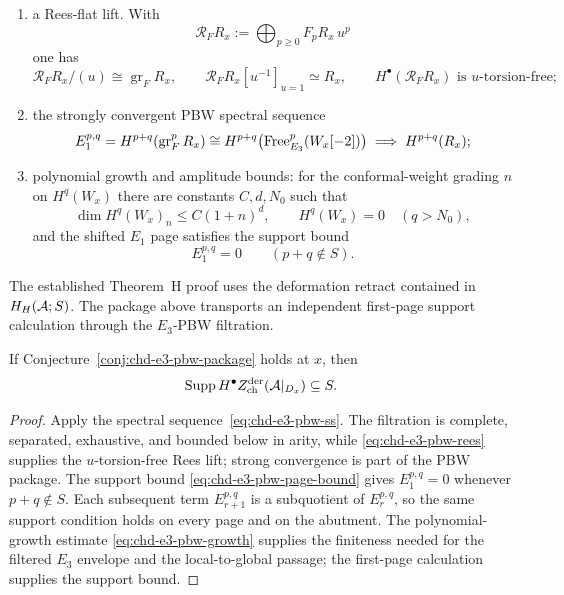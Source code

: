 \begin{conjecture}
\begin{enumerate}[label=\textup{(\roman*)}]
\(E_3\)-envelope gives the associated graded;
\item a Rees-flat lift. With
\[
 \mathcal R_F R_x:=\bigoplus_{p\ge0}F_pR_x\,u^p
\]
one has
\begin{equation}\label{eq:chd-e3-pbw-rees}
 \mathcal R_F R_x/(u)\cong \operatorname{gr}_F R_x,\qquad
 \mathcal R_F R_x[u^{-1}]_{u=1}\simeq R_x,
 \qquad H^\bullet(\mathcal R_F R_x)\text{ is }u\text{-torsion-free};
\end{equation}
\item the strongly convergent PBW spectral sequence
\begin{equation}\label{eq:chd-e3-pbw-ss}
 E_1^{p,q}
 =
 H^{p+q}\!\left(\operatorname{gr}_F^pR_x\right)
 \cong
 H^{p+q}\!\left(\mathrm{Free}^p_{E_3}(W_x[-2])\right)
 \;\Longrightarrow\;
 H^{p+q}(R_x);
\end{equation}
\item polynomial growth and amplitude bounds: for the conformal-weight
grading $n$ on $H^q(W_x)$ there are constants $C,d,N_0$ such that
\begin{equation}\label{eq:chd-e3-pbw-growth}
 \dim H^q(W_x)_n \le C(1+n)^d,\qquad
 H^q(W_x)=0\quad(q>N_0),
\end{equation}
and the shifted $E_1$ page satisfies the support bound
\begin{equation}\label{eq:chd-e3-pbw-page-bound}
 E_1^{p,q}=0 \qquad (p+q\notin S).
\end{equation}
\end{enumerate}
The established Theorem~H proof uses the deformation retract contained
in $H_H(\mathcal{A};S)$. The package above transports an independent
first-page support calculation through the $E_3$-PBW filtration.
\end{conjecture}

\begin{lemma}%
\label{lem:chd-e3-rigidity-point}%
%
If Conjecture~\ref{conj:chd-e3-pbw-package} holds at $x$, then
\[
 \operatorname{Supp}H^\bullet
 Z^{\mathrm{der}}_{\mathrm{ch}}(\mathcal{A}|_{D_x})\subseteq S.
\]
\end{lemma}

\begin{proof}
Apply the spectral sequence~\eqref{eq:chd-e3-pbw-ss}. The filtration is
complete, separated, exhaustive, and bounded below in arity, while
\eqref{eq:chd-e3-pbw-rees} supplies the $u$-torsion-free Rees lift;
strong convergence is part of the PBW package. The support bound
\eqref{eq:chd-e3-pbw-page-bound} gives \(E_1^{p,q}=0\) whenever
\(p+q\notin S\).  Each subsequent term \(E_{r+1}^{p,q}\) is a
subquotient of \(E_r^{p,q}\), so the same support condition holds on
every page and on the abutment. The polynomial-growth estimate
\eqref{eq:chd-e3-pbw-growth} supplies the finiteness needed for the
filtered $E_3$ envelope and the local-to-global passage; the
first-page calculation supplies the support bound.
\end{proof}

